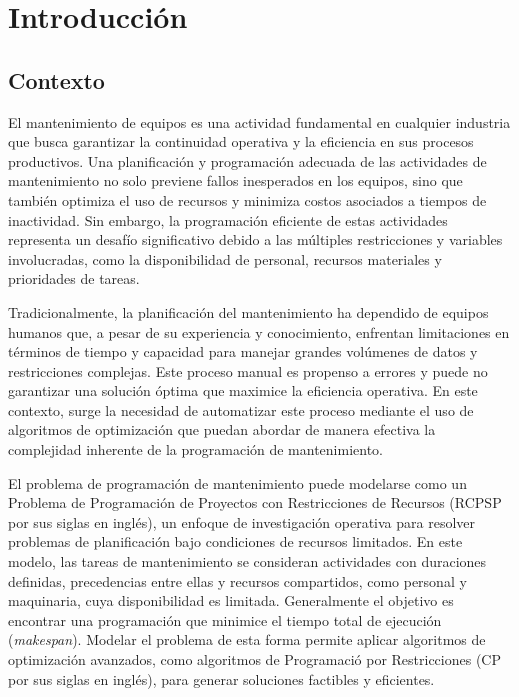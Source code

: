 \documentclass{article}
\begin{document}
\tableofcontents
\newpage

\section{Introducción}
\subsection{Contexto}
El mantenimiento de equipos es una actividad fundamental en cualquier industria que busca garantizar la continuidad operativa y la eficiencia en sus procesos productivos. Una planificación y programación adecuada de las actividades de mantenimiento no solo previene fallos inesperados en los equipos, sino que también optimiza el uso de recursos y minimiza costos asociados a tiempos de inactividad. Sin embargo, la programación eficiente de estas actividades representa un desafío significativo debido a las múltiples restricciones y variables involucradas, como la disponibilidad de personal, recursos materiales y prioridades de tareas.

Tradicionalmente, la planificación del mantenimiento ha dependido de equipos humanos que, a pesar de su experiencia y conocimiento, enfrentan limitaciones en términos de tiempo y capacidad para manejar grandes volúmenes de datos y restricciones complejas. Este proceso manual es propenso a errores y puede no garantizar una solución óptima que maximice la eficiencia operativa. En este contexto, surge la necesidad de automatizar este proceso mediante el uso de algoritmos de optimización que puedan abordar de manera efectiva la complejidad inherente de la programación de mantenimiento.

El problema de programación de mantenimiento puede modelarse como un Problema de Programación de Proyectos con Restricciones de Recursos (RCPSP por sus siglas en inglés), un enfoque de investigación operativa para resolver problemas de planificación bajo condiciones de recursos limitados. En este modelo, las tareas de mantenimiento se consideran actividades con duraciones definidas, precedencias entre ellas y recursos compartidos, como personal y maquinaria, cuya disponibilidad es limitada. Generalmente el objetivo es encontrar una programación que minimice el tiempo total de ejecución (\textit{makespan}). Modelar el problema de esta forma permite aplicar algoritmos de optimización avanzados, como algoritmos de Programació por Restricciones (CP por sus siglas en inglés), para generar soluciones factibles y eficientes.
\end{document}
